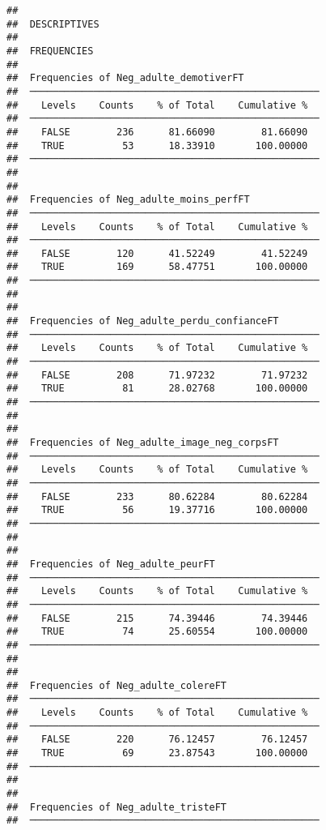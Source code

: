 \documentclass[
]{article}
\begin{document}
\begin{verbatim}
## 
##  DESCRIPTIVES
## 
##  FREQUENCIES
## 
##  Frequencies of Neg_adulte_demotiverFT              
##  ────────────────────────────────────────────────── 
##    Levels    Counts    % of Total    Cumulative %   
##  ────────────────────────────────────────────────── 
##    FALSE        236      81.66090        81.66090   
##    TRUE          53      18.33910       100.00000   
##  ────────────────────────────────────────────────── 
## 
## 
##  Frequencies of Neg_adulte_moins_perfFT             
##  ────────────────────────────────────────────────── 
##    Levels    Counts    % of Total    Cumulative %   
##  ────────────────────────────────────────────────── 
##    FALSE        120      41.52249        41.52249   
##    TRUE         169      58.47751       100.00000   
##  ────────────────────────────────────────────────── 
## 
## 
##  Frequencies of Neg_adulte_perdu_confianceFT        
##  ────────────────────────────────────────────────── 
##    Levels    Counts    % of Total    Cumulative %   
##  ────────────────────────────────────────────────── 
##    FALSE        208      71.97232        71.97232   
##    TRUE          81      28.02768       100.00000   
##  ────────────────────────────────────────────────── 
## 
## 
##  Frequencies of Neg_adulte_image_neg_corpsFT        
##  ────────────────────────────────────────────────── 
##    Levels    Counts    % of Total    Cumulative %   
##  ────────────────────────────────────────────────── 
##    FALSE        233      80.62284        80.62284   
##    TRUE          56      19.37716       100.00000   
##  ────────────────────────────────────────────────── 
## 
## 
##  Frequencies of Neg_adulte_peurFT                   
##  ────────────────────────────────────────────────── 
##    Levels    Counts    % of Total    Cumulative %   
##  ────────────────────────────────────────────────── 
##    FALSE        215      74.39446        74.39446   
##    TRUE          74      25.60554       100.00000   
##  ────────────────────────────────────────────────── 
## 
## 
##  Frequencies of Neg_adulte_colereFT                 
##  ────────────────────────────────────────────────── 
##    Levels    Counts    % of Total    Cumulative %   
##  ────────────────────────────────────────────────── 
##    FALSE        220      76.12457        76.12457   
##    TRUE          69      23.87543       100.00000   
##  ────────────────────────────────────────────────── 
## 
## 
##  Frequencies of Neg_adulte_tristeFT                 
##  ────────────────────────────────────────────────── 

\end{verbatim}
\end{document}

